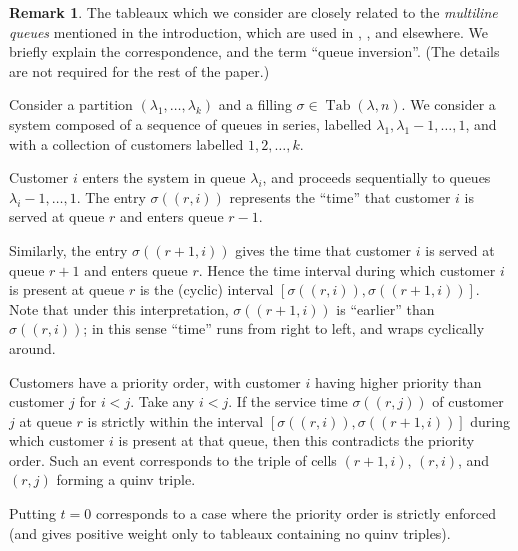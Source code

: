\documentclass[11pt]{article}
\theoremstyle{definition}
\newtheorem{remark}[theo]{Remark}
\numberwithin{equation}{section}
\DeclareMathOperator{\PQT}{Tab}
\begin{document}
\begin{remark}\label{rem:terminology}
The tableaux which we consider are closely related to the
\emph{multiline queues} mentioned in the introduction, which are used in 
\cite{FM07}, \cite{martin-2020}, \cite{CMW18} and elsewhere. 
We briefly explain the correspondence, and the term ``queue inversion''.
(The details are not required for the rest of the paper.)

Consider a partition $(\lambda_1, \dots, \lambda_k)$ and a filling $\sigma\in\PQT(\lambda,n)$. 
We consider a system composed of a sequence of queues in series,
labelled $\lambda_1, \lambda_1-1, \dots, 1$, 
and with a collection of customers labelled $1,2,\dots, k$. 

Customer $i$ enters the system in queue $\lambda_i$, and 
proceeds sequentially to queues $\lambda_i-1, \dots, 1$. 
The entry $\sigma((r,i))$ represents the ``time'' that customer
$i$ is served at queue $r$ and enters queue $r-1$. 

Similarly, the entry $\sigma((r+1,i))$ gives the time that customer $i$
is served at queue $r+1$ and enters queue $r$. Hence
the time interval during which customer $i$ is present at 
queue $r$ is the (cyclic) interval $[\sigma((r,i)), \sigma((r+1,i))]$. 
Note that under this interpretation, $\sigma((r+1,i))$ is ``earlier''
than $\sigma((r,i))$; in this sense
``time'' runs from right to left, and wraps 
cyclically around.

Customers have a priority order, with customer $i$ having
higher priority than customer $j$ for $i<j$. Take any $i<j$. If the service time
$\sigma((r,j))$ of customer $j$ at queue $r$ is strictly within the
interval $[\sigma((r,i)), \sigma((r+1,i))]$ during which customer $i$ is present
at that queue, then this contradicts the priority order. 
Such an event corresponds to 
the triple of cells $(r+1,i)$, $(r,i)$, and $(r,j)$ forming a quinv triple. 

Putting $t=0$ corresponds to a case where the priority order is strictly enforced
(and gives positive weight only to tableaux containing no quinv triples). 
\end{remark}
\end{document}
